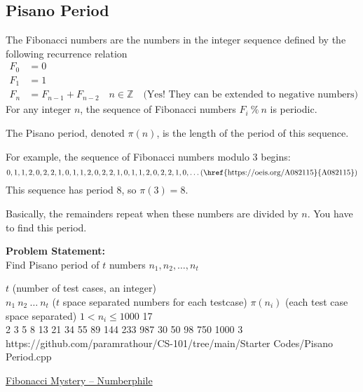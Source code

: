 \documentclass[../../Problems]{subfiles}
\begin{document}
\subsection{Pisano Period}
The Fibonacci numbers are the numbers in the integer sequence defined by the following recurrence relation
\begin{equation}
	\begin{aligned}
		F_0 &= 0\\
		F_1 &= 1 \\
		F_n &= F_{n-1} + F_{n-2}\quad n \in \mathbb{Z}\quad\text{(Yes! They can be extended to negative numbers)}
	\end{aligned}
\end{equation}
For any integer $n$, the sequence of Fibonacci numbers $F_i \ \%\ n$ is periodic.

The Pisano period, denoted $\pi(n)$, is the length of the period of this sequence.

For example, the sequence of Fibonacci numbers modulo $3$ begins:
\begin{equation*}
	0, 1, 1, 2, 0, 2, 2, 1, 0, 1, 1, 2, 0, 2, 2, 1, 0, 1, 1, 2, 0, 2, 2, 1, 0,\ldots\text{(\href{https://oeis.org/A082115}{A082115})}
\end{equation*}
This sequence has period $8$, so $\pi(3) = 8$.

Basically, the remainders repeat when these numbers are divided by $n$. You have to find this period.

\textbf{Problem Statement:}\\
Find Pisano period of $t$ numbers $n_1,n_2,\ldots,n_t$
\begin{testcases}
	{$t$ \hfill(number of test cases, an integer)\\
	$n_1\ n_2\ \ldots\ n_t$ \hfill($t$ space separated numbers for each testcase)}
	{$\pi(n_i)$ \hfill(each test case space separated)}
	{$1 < n_i \leq 1000$}
	{17\\2 3 5 8 13 21 34 55 89 144 233 987 30 50 98 750 1000}
	{3}
	{https://github.com/paramrathour/CS-101/tree/main/Starter Codes/Pisano Period.cpp}
\end{testcases}
\begin{funvideo}
\href{https://youtu.be/Nu-lW-Ifyec}{Fibonacci Mystery -- Numberphile}
\end{funvideo}
\end{document}
